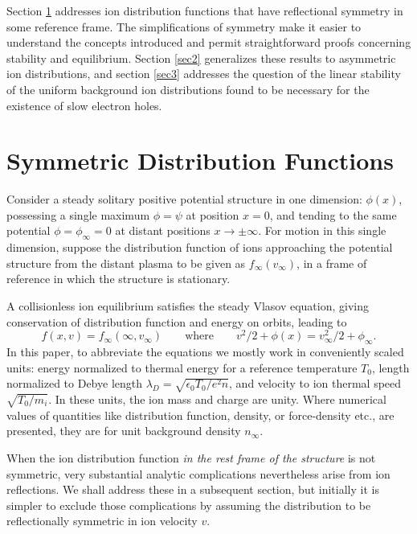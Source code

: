 \documentclass[pre]{revtex4-2}
\begin{document}
Section \ref{sec1} addresses ion distribution functions that have
reflectional symmetry in some reference frame. The simplifications of
symmetry make it easier to understand the concepts introduced and
permit straightforward proofs concerning stability and
equilibrium. Section \ref{sec2} generalizes these results to
asymmetric ion distributions, and section \ref{sec3} addresses the
question of the linear stability of the uniform background ion
distributions found to be necessary for the existence of slow electron
holes.


\section{Symmetric Distribution Functions}\label{sec1}


Consider a steady solitary positive potential structure in one
dimension: $\phi(x)$, possessing a single maximum $\phi=\psi$ at
position $x=0$, and tending to the same potential $\phi=\phi_\infty=0$
at distant positions $x\to \pm \infty$. For motion in this single
dimension, suppose the distribution function of ions approaching the
potential structure from the distant plasma to be given as
$f_\infty(v_\infty)$, in a frame of reference in which the structure
is stationary.

 A collisionless ion equilibrium
satisfies the steady Vlasov equation, giving conservation of
distribution function and energy on orbits, leading to
\begin{equation}
  f(x,v)=f_\infty(\infty,v_\infty) \qquad\mbox{where}\qquad 
  v^2/2+\phi(x) = v_\infty^2/2+\phi_\infty. 
\end{equation}
In this paper, to abbreviate the equations we mostly work in
conveniently scaled units: energy normalized to thermal energy for a
reference temperature $T_0$, length normalized to Debye length
$\lambda_D=\sqrt{\epsilon_0 T_0/e^2n}$, and velocity to ion thermal
speed $\sqrt{T_0/m_i}$. In these units, the ion mass and charge are
unity. Where numerical values of quantities like distribution
function, density, or force-density etc., are presented, they are for
unit background density $n_\infty$.

When the ion distribution function \emph{in the rest frame of the
  structure} is not symmetric, very substantial analytic complications
nevertheless arise from ion reflections. We shall address these in a
subsequent section, but initially it is simpler to exclude those
complications by assuming the distribution to be reflectionally
symmetric in ion velocity $v$.
\end{document}

